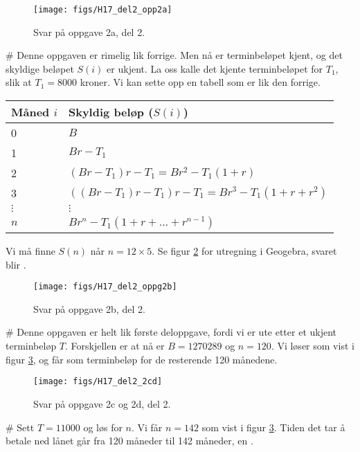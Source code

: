 \begin{easylist}[enumerate]
	\begin{figure}[ht!]
	\centering
	\texttt{[image: figs/H17\_del2\_opp2a]}
	\caption{Svar på oppgave 2a, del 2.}
	\label{fig:H17_del2_opp2a}
	\end{figure}

	# Denne oppgaven er rimelig lik forrige.
	Men nå er terminbeløpet kjent, og det skyldige beløpet $S(i)$ er ukjent.
	La oss kalle det kjente terminbeløpet for $T_1$, slik at $T_1 = 8000$ kroner.
	Vi kan sette opp en tabell som er lik den forrige.
	\begin{center}
		\begin{tabular}{ll}
			\textbf{Måned} $i$ & \textbf{Skyldig beløp} ($S(i)$)\\ \hline
			0 & $B$  \\
			1 & $Br - T_1$  \\
			2 & $(Br - T_1)r - T_1 = Br^2 - T_1(1+ r)$  \\
			3 & $((Br - T_1)r - T_1)r - T_1 = Br^3 - T_1(1+ r + r^2)$  \\
			$\vdots$ & $\vdots$ \\
			$n$ & $Br^n - T_1(1+ r + \dots + r^{n-1})$ 
		\end{tabular}
	\end{center}
	Vi må finne $S(n)$ når $n = 12 \times 5$.
	Se figur \ref{fig:H17_del2_oppg2b} for utregning i Geogebra,
	svaret blir .
	
	\begin{figure}[ht!]
		\centering
		\texttt{[image: figs/H17\_del2\_oppg2b]}
		\caption{Svar på oppgave 2b, del 2.}
		\label{fig:H17_del2_oppg2b}
	\end{figure}
	
	# Denne oppgaven er helt lik første deloppgave, fordi vi er ute etter et ukjent terminbeløp $T$.
	Forskjellen er at nå er $B = 1270289$ og $n = 120$.
	Vi løser som vist i figur \ref{fig:H17_del2_2c}, og får 
	 som terminbeløp for de resterende 120 månedene.
	
		\begin{figure}[ht!]
			\centering
			\texttt{[image: figs/H17\_del2\_2cd]}
			\caption{Svar på oppgave 2c og 2d, del 2.}
			\label{fig:H17_del2_2c}
		\end{figure}
	
	# Sett $T = 11000$ og løs for $n$.
	Vi får $n = 142$ som vist i figur \ref{fig:H17_del2_2c}.
	Tiden det tar å betale ned lånet går fra 120 måneder til 142 måneder, en .
	
	

\end{easylist}


